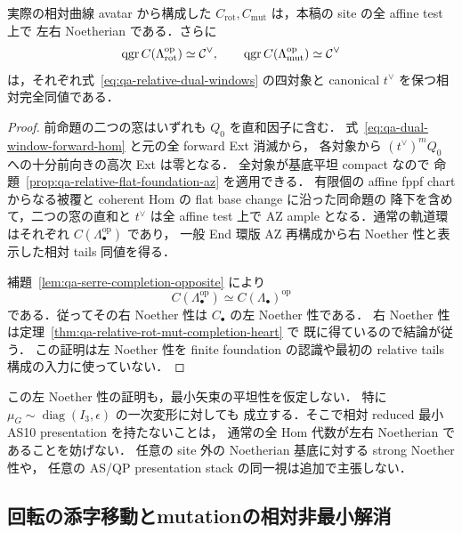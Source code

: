 \begin{theorem}[回転・mutation完成の左右Noether性]
\label{thm:qa-relative-rot-mut-two-sided-noetherian}
実際の相対曲線 avatar から構成した
$C_{\mathrm{rot}},C_{\mathrm{mut}}$ は，本稿の site の全 affine test 上で
左右 Noetherian である．さらに
\[
 \operatorname{qgr} C(\Lambda_{\mathrm{rot}}^{\mathrm{op}})\simeq\mathcal C^\vee,
 \qquad
 \operatorname{qgr} C(\Lambda_{\mathrm{mut}}^{\mathrm{op}})\simeq\mathcal C^\vee
\]
は，それぞれ式~\eqref{eq:qa-relative-dual-windows} の四対象と
canonical $t^\vee$ を保つ相対完全同値である．
\end{theorem}
\begin{proof}
前命題の二つの窓はいずれも $Q_0$ を直和因子に含む．
式~\eqref{eq:qa-dual-window-forward-hom} と元の全 forward Ext 消滅から，
各対象から $(t^\vee)^mQ_0$ への十分前向きの高次 Ext は零となる．
全対象が基底平坦 compact なので
命題~\ref{prop:qa-relative-flat-foundation-az} を適用できる．
有限個の affine fppf chart からなる被覆と coherent Hom の flat base change に沿った同命題の
降下を含めて，二つの窓の直和と $t^\vee$ は全 affine test 上で AZ ample
となる．通常の軌道環はそれぞれ $C(\Lambda_\bullet^{\mathrm{op}})$ であり，
一般 End 環版 AZ 再構成から右 Noether 性と表示した相対 tails 同値を得る．

補題~\ref{lem:qa-serre-completion-opposite} により
\[
 C(\Lambda_\bullet^{\mathrm{op}})\simeq C(\Lambda_\bullet)^{\mathrm{op}}
\]
である．従ってその右 Noether 性は $C_\bullet$ の左 Noether 性である．
右 Noether 性は定理~\ref{thm:qa-relative-rot-mut-completion-heart} で
既に得ているので結論が従う．
この証明は左 Noether 性を finite foundation の認識や最初の
relative tails 構成の入力に使っていない．
\end{proof}

\begin{remark}[非被約壁を横断する族]
この左 Noether 性の証明も，最小矢束の平坦性を仮定しない．
特に $\mu_G\sim\operatorname{diag}(I_3,\epsilon)$ の一次変形に対しても
成立する．そこで相対 reduced 最小 AS10 presentation を持たないことは，
通常の全 Hom 代数が左右 Noetherian であることを妨げない．
任意の site 外の Noetherian 基底に対する strong Noether 性や，
任意の AS/QP presentation stack の同一視は追加で主張しない．
\end{remark}

\subsection{回転の添字移動とmutationの相対非最小解消}
\label{subsec:qa-relative-mutation-nonminimal-as}

